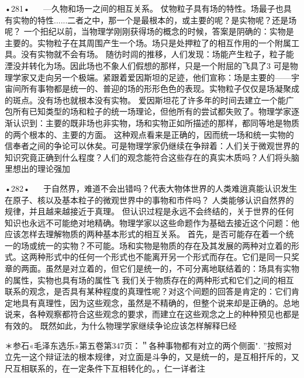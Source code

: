 •281•
  
—久物和场一之间的相互关系。
仗物粒子具有场的特性。场最子也具有实物的特性......二者之中，那一个是最根本的，或主要的呢？是实物呢？还是场呢？
一个抇纪以前，当物理学刚刚获得场的概念的时候，答案是阴确的：实物是主要的。实物粒子在其周围产生一个场。场只是处押粒了的相互作用的一个附属工具。没有实物就不会有场。
随彷时闾的推移，人们发现：场能产生粒子，粒子能湮没并转化为场。因此场也不象人们假想的那样，只是一个附屈的飞具了3
可是物理学家又走向另一个极端。紧跟着爱因斯坦的足迹，他们宣称：场是主要的——宇宙间所有事物都是统一的、普迎的场的形形色色的表现。实物粒子仅仅是场凝聚成的斑点。没有场也就根本没有实物。
爱因斯坦花了许多年的时间去建立一个能广包所有已知类型的场和粒子的统一场理论，但他所有的尝试都失败了。物理学家逐渐认识到：主要的既非场也非实物，场和实物正如所描述的那样，都同等地是物质的两个根本的、主要的方面。
这种观点看来是正确的，因而统一场和统一实物的信奉者之间的争论可以休矣。可是物理学家仍继续在争辩着：人们关于微观世界的知识究竟正确到什么程度？人们的观念能符合这些存在的真实木质吗？人们将头脑里想出的理论强加

•282•
  
于自然界，难道不会出错吗？代表大物体世界的人类难逍真能认识发生在原子、核以及基本粒子的微观世界中的事物和市件吗？
人类能够认识自然界的规律，并且越来越接近于真理。
但认识过程是永远不会终结的，关于世界的任何知识也永远不可能绝对地精确。物理学家以这些命题作为基础去接近这个问题：他应该怎样去理解物质的两种基本形式的相互关系。
首先，是否可能存在着一个统一的场或统一的实物？不可能。场和实物是物质的存在及其发展的两种对立着的形式。这两种形式中的任何一个形式也不能离开另一个形式而存在。它们是同一只奖章的两面。虽然是对立着的，但它们是统一的，不可分离地联结着的：场具有实物的属性，实物也具有场的属性飞
我们关于物质存在的两种形式和它们之间的相互联系的观念，是否具有某种程度的真理性呢？对这个间题的回答是肯定的：它们肯定地具有真理性，因为这些观念，虽然是不精确的，但整个说来却是正确的。总地说来，各种观察都符合这些观念的要求，而建立在这些观念之上的种种预见也都是有效的。
既然如此，为什么物理学家继续争论应该怎样解释巳经

＊参石«毛泽东选乐»第五卷第347页：＂各种事物都有对立的两个侧面".
”按照对立先一这个辩证法的根本规律，对立面是斗争的，又是统一的，是互相扞斥的，又尺互相联系的，在一定条件下互相转化的。，仁一详者注


